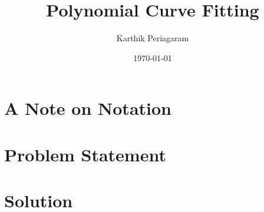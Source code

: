 \documentclass{article}
\title{Polynomial Curve Fitting}
\author{Karthik Periagaram}
\date{\today}
\begin{document}
\maketitle

\section{A Note on Notation}

\section{Problem Statement}

\section{Solution}




\end{document}
